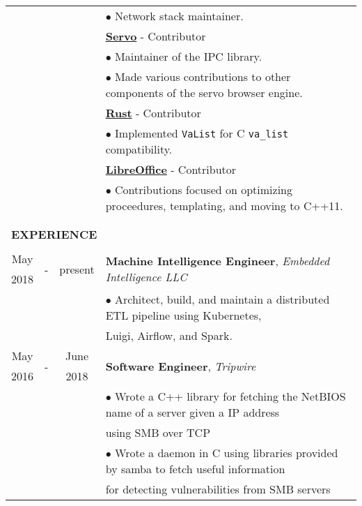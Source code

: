 \documentclass[10pt]{article}
\begin{document}
\begin{table}[ht]
\begin{tabular}{@{\hspace{0mm}}c@{\hspace{1mm}}c@{\hspace{3mm}}cl}
            & & & $\bullet$ Network stack maintainer.\\[2mm]
            & & & \textbf{\href{https://github.com/servo}{Servo}} - Contributor\\
            & & & $\bullet$ Maintainer of the IPC library.\\
            & & & $\bullet$ Made various contributions to other components of the servo browser engine.\\[2mm]
            & & & \textbf{\href{https://github.com/rust-lang}{Rust}} - Contributor\\
            & & & $\bullet$ Implemented \texttt{VaList} for C \texttt{va\_list} compatibility.\\[2mm]
            & & & \textbf{\href{https://github.com/LibreOffice}{LibreOffice}} - Contributor\\
            & & & $\bullet$ Contributions focused on optimizing proceedures, templating, and moving to C++11.\\\\[-2mm]
            \hline\\[-3mm]
            \multicolumn{4}{l}{\large{\textbf{EXPERIENCE}}}\\
            \hline\\[-2mm]
            May & \multirow{2}{*}{-} & \multirow{2}{*}{present} & \multirow{2}{*}{\textbf{Machine Intelligence Engineer}, \textit{Embedded Intelligence LLC}}\\
            2018 & & &\\
            & & & $\bullet$ Architect, build, and maintain a distributed ETL pipeline using Kubernetes,\\
            & & & \hspace*{4mm}Luigi, Airflow, and Spark.\\
            May & \multirow{2}{*}{-} & June & \multirow{2}{*}{\textbf{Software Engineer}, \textit{Tripwire}}\\
            2016 & & 2018 &\\
            & & & $\bullet$ Wrote a C++ library for fetching the NetBIOS name of a server given a IP address\\
            & & & \hspace*{4mm}using SMB over TCP\\
            & & & $\bullet$ Wrote a daemon in C using libraries provided by samba to fetch useful information\\
            & & & \hspace*{4mm}for detecting vulnerabilities from SMB servers\\

\end{tabular}
\end{table}
\end{document}
